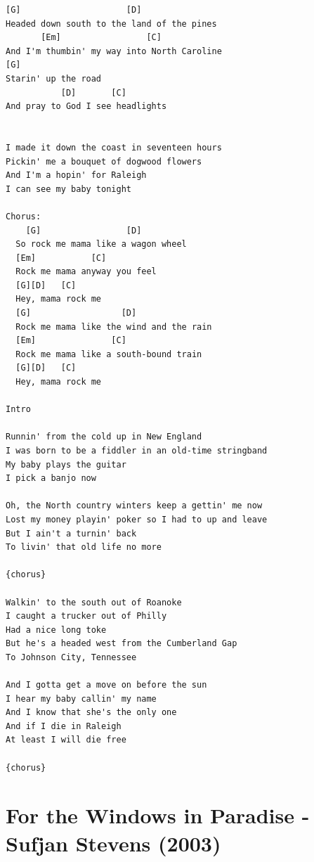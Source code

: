 \documentclass[
]{book}
\let\stdsection\section
\renewcommand\section{\clearpage\stdsection}
\begin{document}
\begin{verbatim}
[G]                     [D]
Headed down south to the land of the pines
       [Em]                 [C]
And I'm thumbin' my way into North Caroline
[G]
Starin' up the road
           [D]       [C]
And pray to God I see headlights


I made it down the coast in seventeen hours 
Pickin' me a bouquet of dogwood flowers 
And I'm a hopin' for Raleigh 
I can see my baby tonight

Chorus:
    [G]                 [D]
  So rock me mama like a wagon wheel
  [Em]           [C]
  Rock me mama anyway you feel
  [G][D]   [C]
  Hey, mama rock me
  [G]                  [D]
  Rock me mama like the wind and the rain
  [Em]               [C]
  Rock me mama like a south-bound train
  [G][D]   [C]
  Hey, mama rock me

Intro

Runnin' from the cold up in New England
I was born to be a fiddler in an old-time stringband
My baby plays the guitar
I pick a banjo now

Oh, the North country winters keep a gettin' me now
Lost my money playin' poker so I had to up and leave
But I ain't a turnin' back
To livin' that old life no more

{chorus}

Walkin' to the south out of Roanoke
I caught a trucker out of Philly
Had a nice long toke
But he's a headed west from the Cumberland Gap
To Johnson City, Tennessee

And I gotta get a move on before the sun
I hear my baby callin' my name
And I know that she's the only one
And if I die in Raleigh
At least I will die free

{chorus}
\end{verbatim}

\hypertarget{selected-songs-windows-in-paradise}{%
\section{For the Windows in Paradise - Sufjan Stevens (2003)}\label{selected-songs-windows-in-paradise}}
\end{document}
